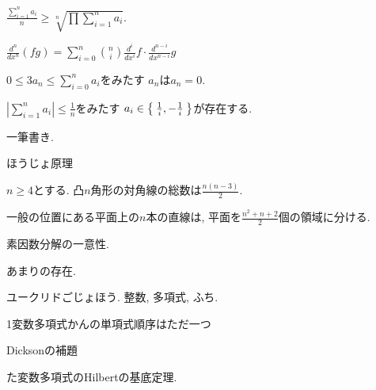 \begin{prop}
  $\frac{\sum_{i=1}^n a_i}{n} \geq \sqrt[n]{\prod\sum_{i=1}^n a_i}$.
\end{prop}


\begin{prop}
$\frac{d^n}{dx^n}(fg)=\sum_{i=0}^n\binom{n}{i}\frac{d^i}{dx^i}f \cdot \frac{d^{n-i}}{dx^{n-i}}g$
\end{prop}




\begin{prop}
  $0\leq 3a_n\leq\sum_{i=0}^n a_i$をみたす
  $a_n$は$a_n=0$.
\end{prop}

\begin{prop}
  $|\sum_{i=1}^{n}a_i|\leq \frac{1}{n}$をみたす
  $a_i\in\Set{\frac{1}{i},-\frac{1}{i}}$が存在する.
\end{prop}

\begin{prop}
一筆書き.
\end{prop}

\begin{prop}
ほうじょ原理
\end{prop}

\begin{prop}
  $n\geq 4$とする.
  凸$n$角形の対角線の総数は$\frac{n(n-3)}{2}$.
\end{prop}

\begin{prop}
  一般の位置にある平面上の$n$本の直線は,
  平面を$\frac{n^2+n+2}{2}$個の領域に分ける.
\end{prop}

\begin{prop}
  素因数分解の一意性.
\end{prop}

\begin{prop}
  あまりの存在.
\end{prop}

\begin{prop}
  ユークリドごじょほう.  整数, 多項式, ふち.
\end{prop}

\begin{prop}
  1変数多項式かんの単項式順序はただ一つ
\end{prop}

\begin{prop}
  Dicksonの補題
\end{prop}

\begin{prop}
  た変数多項式のHilbertの基底定理.
\end{prop}

